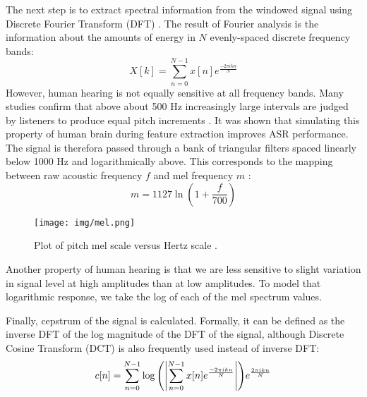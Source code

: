 The next step is to extract spectral information from the windowed signal using Discrete Fourier Transform (DFT) . The result of Fourier analysis is the information about the amounts of energy in $N$ evenly-spaced discrete frequency bands:
\begin{equation}
  X[k]=\sum_{n=0}^{N-1}x[n]e^{\frac{-2\pi ikn}{N}}
\end{equation}
However, human hearing is not equally sensitive at all frequency bands. Many studies confirm that above about 500 Hz increasingly large intervals are judged by listeners to produce equal pitch increments \cite{stevens1937scale, fletcher1938loudness}. It was shown that simulating this property of human brain during feature extraction improves ASR performance. The signal is therefora passed through a bank of triangular filters spaced linearly below 1000 Hz and logarithmically above. This corresponds to the mapping between raw acoustic frequency $f$ and mel frequency $m$ \cite{muda2010voice}:
\begin{equation}
  m=1127\ln(1+\frac{f}{700})
\end{equation}

\begin{figure}[!ht]
  \centering
  \texttt{[image: img/mel.png]}
  \caption{Plot of pitch mel scale versus Hertz scale \cite{vedala2008mel}.}
  \label{figure:mel}
\end{figure}

Another property of human hearing is that we are less sensitive to slight variation in signal level at high amplitudes than at low amplitudes. To model that logarithmic response, we take the log of each of the mel spectrum values.

Finally, cepstrum of the signal is calculated. Formally, it can be defined as the inverse DFT of the log magnitude of the DFT of the signal, although Discrete Cosine Transform (DCT)  is also frequently used instead of inverse DFT:
\begin{equation}
  \label{equation:cepstrum}
  c[n]=\sum_{n=0}^{N-1}\log{\left(\left|\sum_{n=0}^{N-1}x[n]e^{\frac{-2\pi ikn}{N}}\right|\right)}e^{\frac{2\pi ikn}{N}}
\end{equation}

